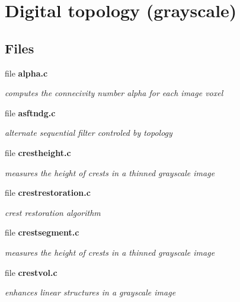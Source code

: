\section{Digital topology (grayscale)}
\label{group__topogray}
\subsection*{Files}
\begin{CompactItemize}
\item 
file \bf{alpha.c}
\begin{CompactList}\small\item\em computes the connecivity number alpha for each image voxel \item\end{CompactList}

\item 
file \bf{asftndg.c}
\begin{CompactList}\small\item\em alternate sequential filter controled by topology \item\end{CompactList}

\item 
file \bf{crestheight.c}
\begin{CompactList}\small\item\em measures the height of crests in a thinned grayscale image \item\end{CompactList}

\item 
file \bf{crestrestoration.c}
\begin{CompactList}\small\item\em crest restoration algorithm \item\end{CompactList}

\item 
file \bf{crestsegment.c}
\begin{CompactList}\small\item\em measures the height of crests in a thinned grayscale image \item\end{CompactList}

\item 
file \bf{crestvol.c}
\begin{CompactList}\small\item\em enhances linear structures in a grayscale image \item\end{CompactList}


\end{CompactItemize}
